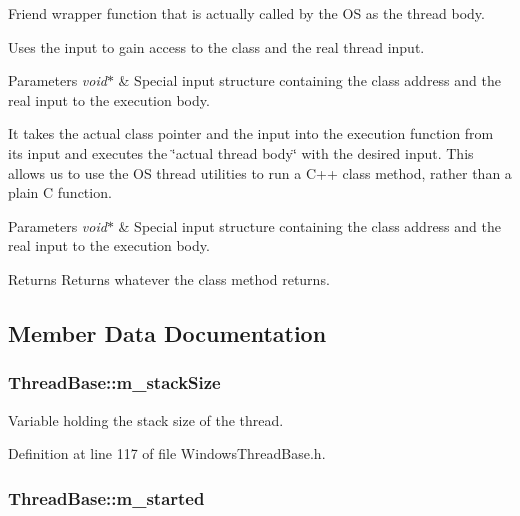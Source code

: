 Friend wrapper function that is actually called by the O\-S as the thread body. 

Uses the input to gain access to the class and the real thread input.


\begin{DoxyParams}{Parameters}
{\em void$\ast$} & Special input structure containing the class address and the real input to the execution body.\\
\hline
\end{DoxyParams}
It takes the actual class pointer and the input into the execution function from its input and executes the \char`\"{}actual thread body\char`\"{} with the desired input. This allows us to use the O\-S thread utilities to run a C++ class method, rather than a plain C function.


\begin{DoxyParams}{Parameters}
{\em void$\ast$} & Special input structure containing the class address and the real input to the execution body.\\
\hline
\end{DoxyParams}
\begin{DoxyReturn}{Returns}
Returns whatever the class method returns. 
\end{DoxyReturn}


\subsection{Member Data Documentation}
\hypertarget{class_thread_base_a9c8b3446d099074f0f1608e5246e137d}{
\subsubsection[{m\-\_\-stack\-Size}]{ Thread\-Base\-::m\-\_\-stack\-Size\hspace{0.3cm}{\ttfamily [private]}}}\label{class_thread_base_a9c8b3446d099074f0f1608e5246e137d}


Variable holding the stack size of the thread. 



Definition at line 117 of file Windows\-Thread\-Base.\-h.

\hypertarget{class_thread_base_a5e2958ae98b989268d1e2be629789d64}{
\subsubsection[{m\-\_\-started}]{ Thread\-Base\-::m\-\_\-started\hspace{0.3cm}{\ttfamily [private]}}}\label{class_thread_base_a5e2958ae98b989268d1e2be629789d64}


